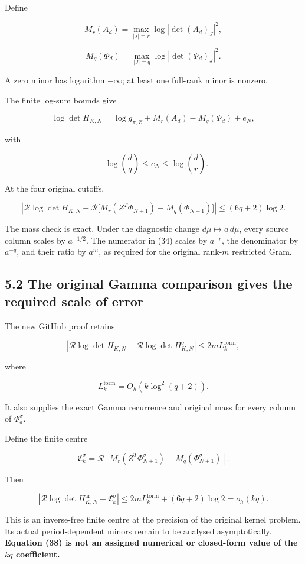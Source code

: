 Define

\[
M_r(A_d)=
\max_{|J|=r}\log|\det(A_d)_J|^2,
\]

\[
M_q(\Phi_d)=
\max_{|J|=q}\log|\det(\Phi_d)_J|^2.
\]

A zero minor has logarithm \(-\infty\); at least one full-rank minor is nonzero.

The finite log-sum bounds give

\[
\boxed{
\log\det H_{K,N}
=
\log g_{\pi,Z}+M_r(A_d)-M_q(\Phi_d)+e_N,
}
\tag{35}
\]

with

\[
\boxed{
-\log\binom dq\le e_N\le\log\binom dr.
}
\tag{36}
\]

At the four original cutoffs,

\[
\boxed{
\left|
\mathcal R\log\det H_{K,N}
-
\mathcal R\bigl[M_r(Z^T\Phi_{N+1})-M_q(\Phi_{N+1})\bigr]
\right|
\le(6q+2)\log2.
}
\tag{37}
\]

The mass check is exact. Under the diagnostic change \(d\mu\mapsto a\,d\mu\), every source column scales by \(a^{-1/2}\). The numerator in (34) scales by \(a^{-r}\), the denominator by \(a^{-q}\), and their ratio by \(a^m\), as required for the original rank-\(m\) restricted Gram.

\subsection{5.2 The original Gamma comparison gives the required scale of error}\label{the-original-gamma-comparison-gives-the-required-scale-of-error}

The new GitHub proof retains

\[
\left|
\mathcal R\log\det H_{K,N}
-
\mathcal R\log\det H^\sigma_{K,N}
\right|
\le2mL_k^{\mathrm{form}},
\]

where

\[
L_k^{\mathrm{form}}=O_h(k\log^2(q+2)).
\]

It also supplies the exact Gamma recurrence and original mass for every column of \(\Phi_d^\sigma\).

Define the finite centre

\[
\mathfrak C_k^\sigma
=
\mathcal R\left[
M_r(Z^T\Phi_{N+1}^\sigma)
-M_q(\Phi_{N+1}^\sigma)
\right].
\]

Then

\[
\boxed{
\left|
\mathcal R\log\det H_{K,N}^{\mathrm{ar}}
-\mathfrak C_k^\sigma
\right|
\le
2mL_k^{\mathrm{form}}+(6q+2)\log2
=o_h(kq).
}
\tag{38}
\]

This is an inverse-free finite centre at the precision of the original kernel problem. Its actual period-dependent minors remain to be analysed asymptotically. \textbf{Equation (38) is not an assigned numerical or closed-form value of the \(kq\) coefficient.}

